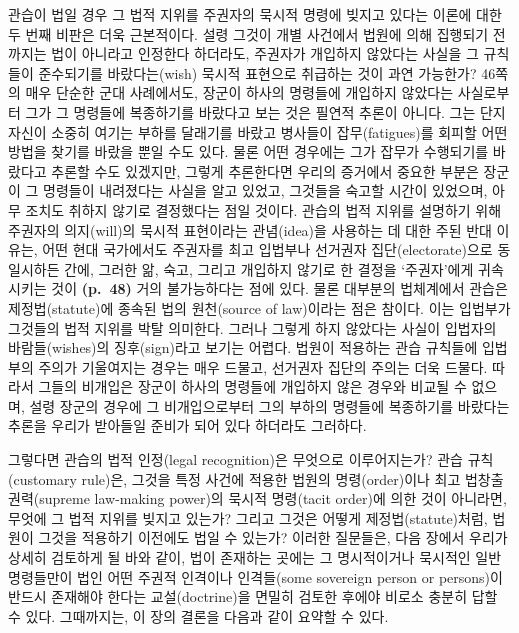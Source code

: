 관습이 법일 경우 그 법적 지위를 주권자의 묵시적 명령에 빚지고 있다는
이론에 대한 두 번째 비판은 더욱 근본적이다. 설령 그것이 개별 사건에서
법원에 의해 집행되기 전까지는 법이 아니라고 인정한다 하더라도, 주권자가
개입하지 않았다는 사실을 그 규칙들이 준수되기를 바랐다는(wish) 묵시적
표현으로 취급하는 것이 과연 가능한가? 46쪽의 매우 단순한 군대
사례에서도, 장군이 하사의 명령들에 개입하지 않았다는 사실로부터 그가 그
명령들에 복종하기를 바랐다고 보는 것은 필연적 추론이 아니다. 그는 단지
자신이 소중히 여기는 부하를 달래기를 바랐고 병사들이 잡무(fatigues)를
회피할 어떤 방법을 찾기를 바랐을 뿐일 수도 있다. 물론 어떤 경우에는 그가
잡무가 수행되기를 바랐다고 추론할 수도 있겠지만, 그렇게 추론한다면
우리의 증거에서 중요한 부분은 장군이 그 명령들이 내려졌다는 사실을 알고
있었고, 그것들을 숙고할 시간이 있었으며, 아무 조치도 취하지 않기로
결정했다는 점일 것이다. 관습의 법적 지위를 설명하기 위해 주권자의
의지(will)의 묵시적 표현이라는 관념(idea)을 사용하는 데 대한 주된 반대
이유는, 어떤 현대 국가에서도 주권자를 최고 입법부나 선거권자
집단(electorate)으로 동일시하든 간에, 그러한 앎, 숙고, 그리고 개입하지
않기로 한 결정을 ‘주권자’에게 귀속시키는 것이 \textbf{(p.~48)} 거의
불가능하다는 점에 있다. 물론 대부분의 법체계에서 관습은
제정법(statute)에 종속된 법의 원천(source of law)이라는 점은 참이다.
이는 입법부가 그것들의 법적 지위를 박탈
의미한다. 그러나 그렇게 하지 않았다는 사실이 입법자의 바람들(wishes)의
징후(sign)라고 보기는 어렵다. 법원이 적용하는 관습 규칙들에 입법부의
주의가 기울여지는 경우는 매우 드물고, 선거권자 집단의 주의는 더욱
드물다. 따라서 그들의 비개입은 장군이 하사의 명령들에 개입하지 않은
경우와 비교될 수 없으며, 설령 장군의 경우에 그 비개입으로부터 그의
부하의 명령들에 복종하기를 바랐다는 추론을 우리가 받아들일 준비가 되어
있다 하더라도 그러하다.

그렇다면 관습의 법적 인정(legal recognition)은 무엇으로 이루어지는가?
관습 규칙(customary rule)은, 그것을 특정 사건에 적용한 법원의
명령(order)이나 최고 법창출 권력(supreme law-making power)의 묵시적
명령(tacit order)에 의한 것이 아니라면, 무엇에 그 법적 지위를 빚지고
있는가? 그리고 그것은 어떻게 제정법(statute)처럼, 법원이 그것을 적용하기
이전에도 법일 수 있는가? 이러한 질문들은, 다음 장에서 우리가 상세히
검토하게 될 바와 같이, 법이 존재하는 곳에는 그 명시적이거나 묵시적인
일반 명령들만이 법인 어떤 주권적 인격이나 인격들(some sovereign person
or persons)이 반드시 존재해야 한다는 교설(doctrine)을 면밀히 검토한
후에야 비로소 충분히 답할 수 있다. 그때까지는, 이 장의 결론을 다음과
같이 요약할 수 있다.

